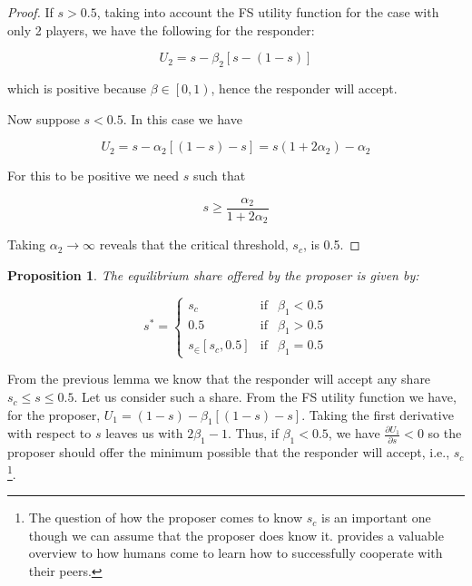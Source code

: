 \documentclass[12pt]{article}
\newtheorem{prop}{Proposition}
\begin{document}
\begin{proof}
	If $s>0.5$, taking into account the FS utility function for the case with only 2 players, we have the following for the responder:
	
	\begin{equation}
		U_2 = s - \beta_2 \left[s - \left(1-s\right)\right]
	\end{equation}

	\noindent	
	which is positive because $\beta \in \left[0,1\right)$, hence the responder will accept.
	
	Now suppose $s<0.5$. In this case we have
	
	\begin{equation}
		U_2 = s - \alpha_2 \left[\left(1-s\right) - s  \right] = s(1+2\alpha_2)-\alpha_2
	\end{equation}
	
	For this to be positive we need $s$ such that 
	
	\begin{equation*}
		s \geq \frac{\alpha_2}{1+2\alpha_2}
	\end{equation*}
	
	Taking $\alpha_2 \rightarrow \infty$ reveals that the critical threshold, $s_c$, is 0.5.
	
\end{proof}

\begin{prop}
	The equilibrium share offered by the proposer is given by:
	
	\begin{equation}
		s^* =\left\{\begin{matrix}
		s_c & \text{if} & \beta_1 <0.5\\ 
		0.5 & \text{if}&\beta_1 >0.5\\ 
		s_ \in \left[s_c,0.5 \right] & \text{if}&\beta_1 =0.5
		\end{matrix}\right.
	\end{equation}	
\end{prop}

From the previous lemma we know that the responder will accept any share $s_c \leq s \leq 0.5$.  Let us consider such a share. From the FS utility function we have, for the proposer, $U_1 = \left(1-s\right) - \beta_1 \left[\left(1-s\right)-s\right]$. Taking the first derivative with respect to $s$ leaves us with $2\beta_1 -1$. Thus, if $\beta_1 < 0.5$, we have $\frac{\partial U_1}{\partial s}<0$ so the proposer should offer the minimum possible that the responder will accept, i.e., $s_c$ \footnote{The question of how the proposer comes to know $s_c$ is an important one though we can assume that the proposer does know it. \cite{henrich2007humans} provides a valuable overview to how humans come to learn how to successfully cooperate with their peers.}.
\end{document}
